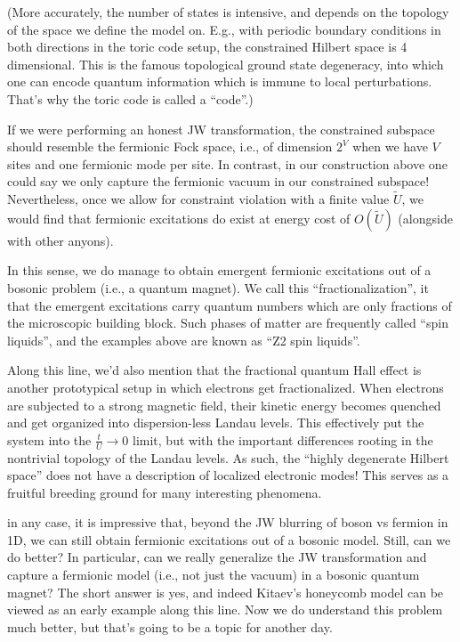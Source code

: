 (More accurately, the number of states is intensive, and depends on the topology of the space we define the model on. E.g., with periodic boundary conditions in both directions in the toric code setup, the constrained Hilbert space is 4 dimensional. This is the famous topological ground state degeneracy, into which one can encode quantum information which is immune to local perturbations. That's why the toric code is called a ``code''.)

If we were performing an honest JW transformation, the constrained subspace should resemble the fermionic Fock space, i.e., of dimension $2^V$ when we have $V$ sites and one fermionic mode per site. In contrast, in our construction above one could say we only capture the fermionic vacuum in our constrained subspace! Nevertheless, once we allow for constraint violation with a finite value $\tilde{U}$, we would find that fermionic excitations do exist at energy cost of $O(\tilde{U})$ (alongside with other anyons).

In this sense, we do manage to obtain emergent fermionic excitations out of a bosonic problem (i.e., a quantum magnet). We call this ``fractionalization'', it that the emergent excitations carry quantum numbers which are only fractions of the microscopic building block. Such phases of matter are frequently called ``spin liquids'', and the examples above are known as ``Z2 spin liquids''.

Along this line, we'd also mention that the fractional quantum Hall effect is another prototypical setup in which electrons get fractionalized. When electrons are subjected to a strong magnetic field, their kinetic energy becomes quenched and get organized into dispersion-less Landau levels. This effectively put the system into the $\frac{t}{U} \to 0$ limit, but with the important differences rooting in the nontrivial topology of the Landau levels. As such, the ``highly degenerate Hilbert space'' does not have a description of localized electronic modes! This serves as a fruitful breeding ground for many interesting phenomena.

in any case, it is impressive that, beyond the JW blurring of boson vs fermion in 1D, we can still obtain fermionic excitations out of a bosonic model. Still, can we do better? In particular, can we really generalize the JW transformation and capture a fermionic model (i.e., not just the vacuum) in a bosonic quantum magnet? The short answer is yes, and indeed Kitaev's honeycomb model can be viewed as an early example along this line. Now we do understand this problem much better, but that's going to be a topic for another day.


